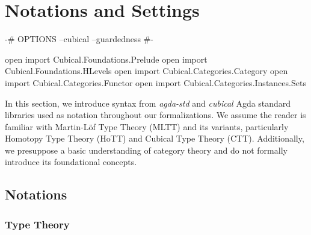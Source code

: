 \chapter{Notations and Settings}

\begin{code}[hide]
{-# OPTIONS --cubical --guardedness #-}

open import Cubical.Foundations.Prelude
open import Cubical.Foundations.HLevels
open import Cubical.Categories.Category
open import Cubical.Categories.Functor
open import Cubical.Categories.Instances.Sets
\end{code}

In this section, we introduce syntax from \textit{agda-std} and \textit{cubical} Agda standard libraries used as notation throughout our formalizations. We assume the reader is familiar with Martin-Löf Type Theory (MLTT) and its variants, particularly Homotopy Type Theory (HoTT) and Cubical Type Theory (CTT). Additionally, we presuppose a basic understanding of category theory and do not formally introduce its foundational concepts.

\section{Notations}

\subsection{Type Theory}

